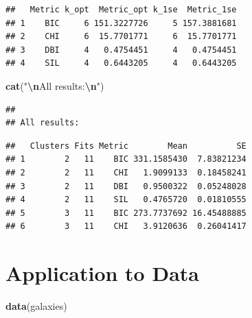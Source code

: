 \documentclass[12pt]{article}
\newenvironment{Shaded}{\begin{snugshade}}{\end{snugshade}}
\newcommand{\FunctionTok}[1]{\textcolor[rgb]{0.13,0.29,0.53}{\textbf{#1}}}
\newcommand{\NormalTok}[1]{#1}
\newcommand{\SpecialCharTok}[1]{\textcolor[rgb]{0.81,0.36,0.00}{\textbf{#1}}}
\newcommand{\StringTok}[1]{\textcolor[rgb]{0.31,0.60,0.02}{#1}}
\begin{document}
\begin{Shaded}
\end{Shaded}

\begin{verbatim}
##   Metric k_opt  Metric_opt k_1se  Metric_1se
## 1    BIC     6 151.3227726     5 157.3881681
## 2    CHI     6  15.7701771     6  15.7701771
## 3    DBI     4   0.4754451     4   0.4754451
## 4    SIL     4   0.6443205     4   0.6443205
\end{verbatim}

\begin{Shaded}
\begin{Highlighting}[]
\FunctionTok{cat}\NormalTok{(}\StringTok{"}\SpecialCharTok{\textbackslash{}n}\StringTok{All results:}\SpecialCharTok{\textbackslash{}n}\StringTok{"}\NormalTok{)}
\end{Highlighting}
\end{Shaded}

\begin{verbatim}
## 
## All results:
\end{verbatim}

\begin{Shaded}
\end{Shaded}

\begin{verbatim}
##   Clusters Fits Metric        Mean          SE
## 1        2   11    BIC 331.1585430  7.83821234
## 2        2   11    CHI   1.9099133  0.18458241
## 3        2   11    DBI   0.9500322  0.05248028
## 4        2   11    SIL   0.4765720  0.01810555
## 5        3   11    BIC 273.7737692 16.45488885
## 6        3   11    CHI   3.9120636  0.26041417
\end{verbatim}

\hypertarget{application-to-data}{%
\section{Application to Data}\label{application-to-data}}

\begin{Shaded}
\begin{Highlighting}[]
\FunctionTok{data}\NormalTok{(galaxies)}
\end{Highlighting}
\end{Shaded}
\end{document}
